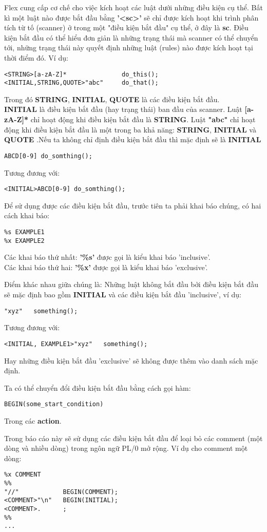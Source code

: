 \documentclass[../report.tex]{subfiles}
\begin{document}
Flex cung cấp cơ chế cho việc kích hoạt các luật dưới những điều kiện cụ thể. 
Bất kì một luật nào được bắt đầu bằng \textbf{'<sc>'} sẽ chỉ được 
kích hoạt khi trình phân tích từ tố (scanner) ở trong 
một "điều kiện bắt đầu" cụ thể, ở đây là \textbf{sc}. 
Điều kiện bắt đầu
có thể hiểu đơn giản là những 
trạng thái mà scanner có thể chuyển tới, 
những trạng thái này quyết định những luật (rules) nào được kích hoạt 
tại thời điểm đó.
Ví dụ: 
\begin{lstlisting}
<STRING>[a-zA-Z]*               do_this();
<INITIAL,STRING,QUOTE>"abc"     do_that();
\end{lstlisting}
Trong đó 
\textbf{STRING},
\textbf{INITIAL},
\textbf{QUOTE}
là các điều kiện bắt đầu. \\
\textbf{INITIAL} là điều kiện bắt đầu (hay trạng thái) 
ban đầu của scanner. Luật \textbf{[a-zA-Z]*} chỉ hoạt động khi 
điều kiện bắt đầu là \textbf{STRING}. Luật 
\textbf{"abc"} chỉ hoạt động khi điều kiện bắt đầu là một 
trong ba khả năng: 
\textbf{STRING},
\textbf{INITIAL} và
\textbf{QUOTE}
.Nếu ta không chỉ định điều kiện bắt đầu thì mặc định sẽ là 
\textbf{INITIAL}
\begin{lstlisting}
ABCD[0-9] do_somthing();
\end{lstlisting}
Tương đương với:
\begin{lstlisting}
<INITIAL>ABCD[0-9] do_somthing();
\end{lstlisting}

Để sử dụng được các điều kiện bắt đầu, trước tiên 
ta phải khai báo chúng, có hai cách khai báo: 
\begin{lstlisting}
%s EXAMPLE1
%x EXAMPLE2
\end{lstlisting}
Các khai báo thứ nhất: \textbf{'\%s'} 
được gọi là kiểu khai báo 'inclusive'. \\
Các khai báo thứ hai: \textbf{'\%x'} được gọi là kiểu 
khai báo 'exclusive'.

Điểm khác nhau giữa chúng là: Những luật không bắt đầu bởi điều kiện bắt đầu sẽ mặc định bao gồm
\textbf{INITIAL} và các điều kiện bắt đầu 'inclusive', ví dụ:
\begin{lstlisting}
"xyz"   something();
\end{lstlisting}
Tương đương với:
\begin{lstlisting}
<INITIAL, EXAMPLE1>"xyz"   something();
\end{lstlisting}
Hay những điều kiện bắt đầu 'exclusive' sẽ không được thêm vào 
danh sách mặc định. 

\noindent Ta có thể chuyển đổi điều kiện bắt đầu bằng cách gọi hàm:
\begin{lstlisting}
BEGIN(some_start_condition)
\end{lstlisting}
Trong các \textbf{action}.

Trong báo cáo này sẽ sử dụng các điều kiện bắt đầu để loại bỏ các 
comment (một dòng và nhiều dòng) trong ngôn ngữ PL/0 mở rộng. 
Ví dụ cho comment một dòng:
\begin{lstlisting}
%x COMMENT
%%
"//"            BEGIN(COMMENT);
<COMMENT>"\n"   BEGIN(INITIAL);
<COMMENT>.      ;
%%
...
\end{lstlisting}
\end{document}
